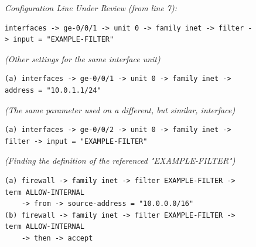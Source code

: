

\begin{figure}[t]
    \centering
    \begin{mdframed}
    \begin{minipage}{0.95\textwidth} %
    \footnotesize %
    
    
    \vspace{1em}
    \textit{Configuration Line Under Review (from line 7):}
    \begin{Verbatim}
interfaces -> ge-0/0/1 -> unit 0 -> family inet -> filter -> input = "EXAMPLE-FILTER"
    \end{Verbatim}
    \hrulefill

    \textit{(Other settings for the same interface unit)}
    \begin{Verbatim}
(a) interfaces -> ge-0/0/1 -> unit 0 -> family inet -> address = "10.0.1.1/24"
    \end{Verbatim}

    \textit{(The same parameter used on a different, but similar, interface)}
    \begin{Verbatim}
(a) interfaces -> ge-0/0/2 -> unit 0 -> family inet -> filter -> input = "EXAMPLE-FILTER"
    \end{Verbatim}


    \textit{(Finding the definition of the referenced "EXAMPLE-FILTER")}
    \begin{Verbatim}
(a) firewall -> family inet -> filter EXAMPLE-FILTER -> term ALLOW-INTERNAL 
    -> from -> source-address = "10.0.0.0/16"
(b) firewall -> family inet -> filter EXAMPLE-FILTER -> term ALLOW-INTERNAL 
    -> then -> accept
    \end{Verbatim}


\end{minipage}
\end{mdframed}
\end{figure}
